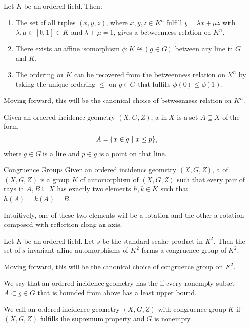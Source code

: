 \begin{exercise}
	Let $K$ be an ordered field. Then:
	\begin{enumerate}
		\item The set of all tuples $(x,y,z)$, where $x,y,z \in K^n$ fulfill $y = \lambda x + \mu z$ with $\lambda, \mu \in [0,1] \subset K$ and $\lambda + \mu = 1$, gives a betweenness relation on $K^n$.
		\item There exists an affine isomorphism $\phi : K \cong (g \in G)$ between any line in $G$ and $K$.
		\item The ordering on $K$ can be recovered from the betweenness relation on $K^n$ by taking the unique ordering $\leq$ on $g \in G$ that fulfills $\phi(0) \leq \phi(1)$.
	\end{enumerate}
\end{exercise}
Moving forward, this will be the canonical choice of betweenness relation on $K^n$.
\begin{definition}
	Given an ordered incidence geometry $(X,G,Z)$, a  in $X$ is a set $A \subseteq X$ of the form
	\begin{align*}
		A = \qty{x \in g ~\middle|~x \leq p},
	\end{align*}
	where $g \in G$ is a line and $p \in g$ is a point on that line.
\end{definition}
\begin{importantdefinition}{Congruence Groups}{}
	Given an ordered incidence geometry $(X,G,Z)$, a  of $(X,G,Z)$ is a group $K$ of automorphism of $(X,G,Z)$ such that every pair of rays in $A,B \subseteq X$ has exactly two elements $h,k \in K$ such that $h(A) = k(A) = B$.
\end{importantdefinition}
Intuitively, one of these two elements will be a rotation and the other a rotation composed with reflection along an axis.
\begin{exercise}
	Let $K$ be an ordered field. Let $s $ be the standard scalar product in $K^2$. Then the set of $s$-invariant affine automorphisms of $K^2$ forms a congruence group of $K^2$.
\end{exercise}
Moving forward, this will be the canonical choice of congruence group on $K^2$.
\begin{definition}
	We say that an ordered incidence geometry has the  if every nonempty subset $A \subset g \in G$ that is bounded from above has a least upper bound.
\end{definition}
\begin{definition}
	We call an ordered incidence geometry $(X,G,Z)$ with congruence group $K$  if $(X,G,Z)$ fulfills the supremum property and $G$ is nonempty.
\end{definition}

